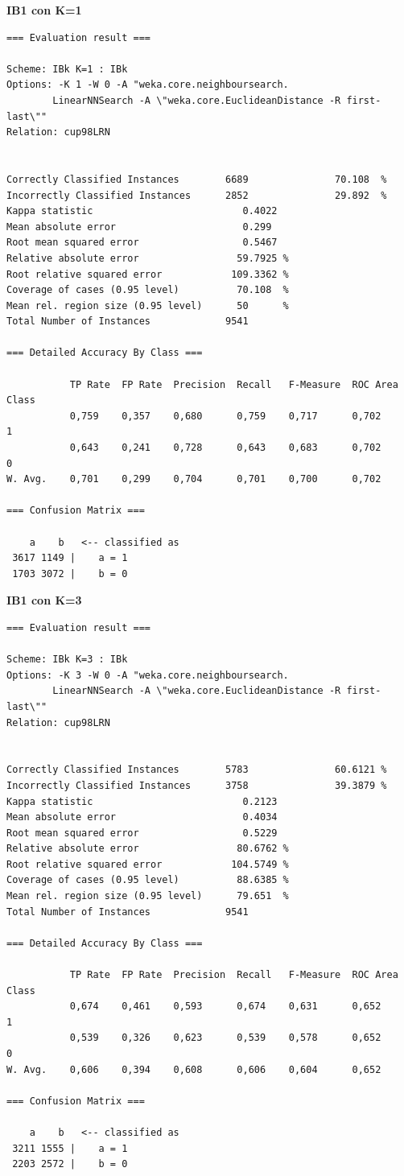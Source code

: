 \textbf{\Large IB1 con K=1}

\begin{verbatim}
=== Evaluation result ===

Scheme: IBk K=1 : IBk
Options: -K 1 -W 0 -A "weka.core.neighboursearch.
		LinearNNSearch -A \"weka.core.EuclideanDistance -R first-last\""
Relation: cup98LRN


Correctly Classified Instances        6689               70.108  %
Incorrectly Classified Instances      2852               29.892  %
Kappa statistic                          0.4022
Mean absolute error                      0.299 
Root mean squared error                  0.5467
Relative absolute error                 59.7925 %
Root relative squared error            109.3362 %
Coverage of cases (0.95 level)          70.108  %
Mean rel. region size (0.95 level)      50      %
Total Number of Instances             9541     

=== Detailed Accuracy By Class ===

           TP Rate  FP Rate  Precision  Recall   F-Measure  ROC Area  Class
           0,759    0,357    0,680      0,759    0,717      0,702     1
           0,643    0,241    0,728      0,643    0,683      0,702     0
W. Avg.    0,701    0,299    0,704      0,701    0,700      0,702     

=== Confusion Matrix ===

    a    b   <-- classified as
 3617 1149 |    a = 1
 1703 3072 |    b = 0
\end{verbatim}

\textbf{\Large IB1 con K=3}

\begin{verbatim}
=== Evaluation result ===

Scheme: IBk K=3 : IBk
Options: -K 3 -W 0 -A "weka.core.neighboursearch.
		LinearNNSearch -A \"weka.core.EuclideanDistance -R first-last\""
Relation: cup98LRN


Correctly Classified Instances        5783               60.6121 %
Incorrectly Classified Instances      3758               39.3879 %
Kappa statistic                          0.2123
Mean absolute error                      0.4034
Root mean squared error                  0.5229
Relative absolute error                 80.6762 %
Root relative squared error            104.5749 %
Coverage of cases (0.95 level)          88.6385 %
Mean rel. region size (0.95 level)      79.651  %
Total Number of Instances             9541     

=== Detailed Accuracy By Class ===

           TP Rate  FP Rate  Precision  Recall   F-Measure  ROC Area  Class
           0,674    0,461    0,593      0,674    0,631      0,652     1
           0,539    0,326    0,623      0,539    0,578      0,652     0
W. Avg.    0,606    0,394    0,608      0,606    0,604      0,652     

=== Confusion Matrix ===

    a    b   <-- classified as
 3211 1555 |    a = 1
 2203 2572 |    b = 0
\end{verbatim}

